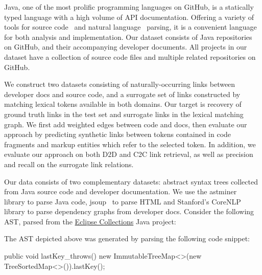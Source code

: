 \documentclass{article}
\begin{document}
Java, one of the most prolific programming languages on GitHub, is a statically typed language with a high volume of API documentation. Offering a variety of tools for source code~\citep{parr2013definitive, hosseini2013javaparser, kovalenko2019pathminer} and natural language~\citep{manning2014stanford, grella2018non} parsing, it is a convenient language for both analysis and implementation. Our dataset consists of Java repositories on GitHub, and their accompanying developer documents. All projects in our dataset have a collection of source code files and multiple related repositories on GitHub.

We construct two datasets consisting of naturally-occurring links between developer docs and source code, and a surrogate set of links constructed by matching lexical tokens available in both domains. Our target is recovery of ground truth links in the test set and surrogate links in the lexical matching graph. We first add weighted edges between code and docs, then evaluate our approach by predicting synthetic links between tokens contained in code fragments and markup entities which refer to the selected token. In addition, we evaluate our approach on both D2D and C2C link retrieval, as well as precision and recall on the surrogate link relations.

Our data consists of two complementary datasets: abstract syntax trees collected from Java source code and developer documentation. We use the astminer~\citep{kovalenko2019pathminer} library to parse Java code, jsoup~\citep{hedley2009jsoup} to parse HTML and Stanford's CoreNLP~\citep{manning2014stanford} library to parse dependency graphs from developer docs. Consider the following AST, parsed from the \href{https://www.eclipse.org/collections/}{Eclipse Collections} Java project:

\vspace{20pt}

\begin{figure}[H]
    \centering
    
    \label{fig:ast}
\end{figure}

\vspace{-30pt}The AST depicted above was generated by parsing the following code snippet:

\begin{javalisting}
public void lastKey_throws() {
    new ImmutableTreeMap<>(new TreeSortedMap<>()).lastKey();
}
\end{javalisting}
\end{document}
